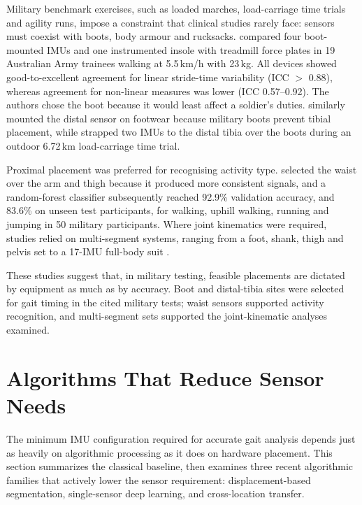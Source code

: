 \documentclass[10pt,a4paper,twocolumn]{article}
\begin{document}
Military benchmark exercises, such as loaded marches, load-carriage time trials and agility runs, impose a constraint that clinical studies rarely face: sensors must coexist with boots, body armour and rucksacks. \citet{slattery2024} compared four boot-mounted IMUs and one instrumented insole with treadmill force plates in 19 Australian Army trainees walking at 5.5\,km/h with 23\,kg. All devices showed good-to-excellent agreement for linear stride-time variability (ICC $>$ 0.88), whereas agreement for non-linear measures was lower (ICC 0.57--0.92). The authors chose the boot because it would least affect a soldier's duties. \citet{fain2024b} similarly mounted the distal sensor on footwear because military boots prevent tibial placement, while \citet{feigel2026} strapped two IMUs to the distal tibia over the boots during an outdoor 6.72\,km load-carriage time trial.

Proximal placement was preferred for recognising activity type. \citet{papadakis2023} selected the waist over the arm and thigh because it produced more consistent signals, and a random-forest classifier subsequently reached 92.9\% validation accuracy, and 83.6\% on unseen test participants, for walking, uphill walking, running and jumping in 50 military participants. Where joint kinematics were required, studies relied on multi-segment systems, ranging from a foot, shank, thigh and pelvis set \citep{fain2024a} to a 17-IMU full-body suit \citep{kessels2021}.

These studies suggest that, in military testing, feasible placements are dictated by equipment as much as by accuracy. Boot and distal-tibia sites were selected for gait timing in the cited military tests; waist sensors supported activity recognition, and multi-segment sets supported the joint-kinematic analyses examined.

\FloatBarrier

\section{Algorithms That Reduce Sensor Needs}
\label{sec:algorithms}

The minimum IMU configuration required for accurate gait analysis depends just as heavily on algorithmic processing as it does on hardware placement. This section summarizes the classical baseline, then examines three recent algorithmic families that actively lower the sensor requirement: displacement-based segmentation, single-sensor deep learning, and cross-location transfer.
\end{document}
